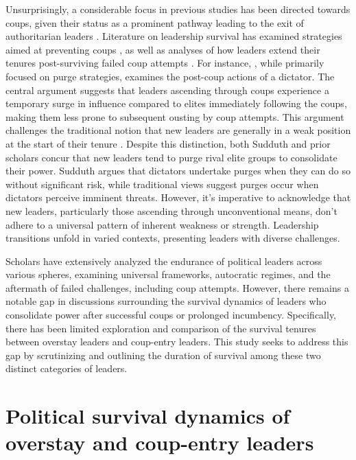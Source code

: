 \documentclass[
  12pt,
  a4paper,
  12pt]{article}
\begin{document}
Unsurprisingly, a considerable focus in previous studies has been
directed towards coups, given their status as a prominent pathway
leading to the exit of authoritarian leaders
\citep{svolik2008, frantz2016}. Literature on leadership survival has
examined strategies aimed at preventing coups
\citep{powell2017, sudduth2017, debruin2020}, as well as analyses of how
leaders extend their tenures post-surviving failed coup attempts
\citep{easton2018}. For instance, \citet{sudduth2017a}, while primarily
focused on purge strategies, examines the post-coup actions of a
dictator. The central argument suggests that leaders ascending through
coups experience a temporary surge in influence compared to elites
immediately following the coups, making them less prone to subsequent
ousting by coup attempts. This argument challenges the traditional
notion that new leaders are generally in a weak position at the start of
their tenure \citep{roessler2011}. Despite this distinction, both
Sudduth and prior scholars concur that new leaders tend to purge rival
elite groups to consolidate their power. Sudduth argues that dictators
undertake purges when they can do so without significant risk, while
traditional views suggest purges occur when dictators perceive imminent
threats. However, it's imperative to acknowledge that new leaders,
particularly those ascending through unconventional means, don't adhere
to a universal pattern of inherent weakness or strength. Leadership
transitions unfold in varied contexts, presenting leaders with diverse
challenges.

Scholars have extensively analyzed the endurance of political leaders
across various spheres, examining universal frameworks, autocratic
regimes, and the aftermath of failed challenges, including coup
attempts. However, there remains a notable gap in discussions
surrounding the survival dynamics of leaders who consolidate power after
successful coups or prolonged incumbency. Specifically, there has been
limited exploration and comparison of the survival tenures between
overstay leaders and coup-entry leaders. This study seeks to address
this gap by scrutinizing and outlining the duration of survival among
these two distinct categories of leaders.

\section{Political survival dynamics of overstay and coup-entry
leaders}\label{political-survival-dynamics-of-overstay-and-coup-entry-leaders}
\end{document}
